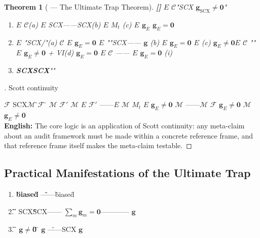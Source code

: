 \documentclass[12pt,a4paper]{article}
\newtheorem{theorem}{Theorem}[section]
\theoremstyle{remark}
\newcommand{\g}{\mathbf{g}}
\newcommand{\rigorPartial}{\textnormal{\textbf{[]}}}
\begin{document}
\begin{theorem}[ — The Ultimate Trap Theorem]\label{thm:ultimate_trap}\rigorPartial
 $ E $  $ \mathcal{C} $"SCX $ \g_{\text{SCX}} \neq \mathbf{0} $"
\begin{enumerate}[label=(\roman*)]
    \item \textbf{} $ E $  $ \mathcal{C} $(a) $ E $ SCX——SCX(b) $ E $  $ M_t $ (c) $ E $  $ \g_E $  $ \g_E = \mathbf{0} $

    \item \textbf{} $ E $ "SCX/"(a)  $ \mathcal{C} $ $ E $  $ \g_E = \mathbf{0} $ $ E $ ""SCX—— $ \g $ (b) $ E $  $ \g_E = \mathbf{0} $  $ E $ (c)  $ \g_E \neq \mathbf{0} $$ E $  $ \mathcal{C} $ ""$ E $ \textbf{}$ \g_E \neq \mathbf{0} $ + VI(d)  $ \g_E = \mathbf{0} $ $ E $  $ \mathcal{C} $ —— $ E $  $ \g_E = \mathbf{0} $ (i)

    \item \textbf{} \textbf{SCXSCX}""
\end{enumerate}
\end{theorem}

\begin{proof}[]
Scott continuity

 $ \mathcal{F} $ SCX$ \mathcal{M} $ \"$ \mathcal{F} $ \" $ \mathcal{M} $  $ \mathcal{F}' $ $ \mathcal{M} $  $ E $  $ \mathcal{F}' $ ——$ E $  $ \mathcal{M} $ $ M_t $  $ E $  $ \g_E \neq \mathbf{0} $ $ \mathcal{M} $ ——$ \mathcal{M} $  $ \mathcal{F} $  $ \g_E \neq \mathbf{0} $  $ \mathcal{M} $  $ \g_E \neq \mathbf{0} $ \\
\textbf{English:} The core logic is an application of Scott continuity: any meta-claim about an audit framework must be made within a concrete reference frame, and that reference frame itself makes the meta-claim testable.
\end{proof}

\subsection{}
\subsection{Practical Manifestations of the Ultimate Trap}

\noindent
\textbf{} 

\begin{enumerate}[label=(\arabic*)]
    \item \textbf{\"biased\"} \"\"——\"biased\"
    
    \item \textbf{\"\"} SCX\"\"\"\"SCX—— $ \sum_m \g_m = \mathbf{0} $———— $ \g $ 
    
    \item \textbf{\" $ \g \neq \mathbf{0} $\"} \" $ \g $ \"——SCX $ \g $
\end{enumerate}
\end{document}
